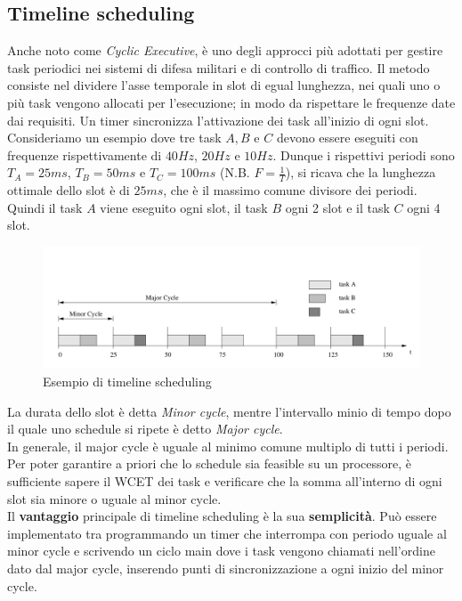 \documentclass[12pt]{article}
\begin{document}
\subsection{Timeline scheduling}
Anche noto come \textit{Cyclic Executive}, è uno degli approcci più adottati per gestire task periodici nei sistemi di difesa militari e di controllo di traffico.
Il metodo consiste nel dividere l'asse temporale in slot di egual lunghezza, nei quali uno o più task vengono allocati per l'esecuzione; in modo da rispettare le frequenze date dai requisiti.
Un timer sincronizza l'attivazione dei task all'inizio di ogni slot.\\
Consideriamo un esempio dove tre task $A,B$ e $C$ devono essere eseguiti con frequenze rispettivamente di $40Hz$, $20Hz$ e $10Hz$.
Dunque i rispettivi periodi sono $T_A=25ms$, $T_B=50ms$ e $T_C=100ms$ (N.B. $F=\frac{1}{T}$), si ricava che la lunghezza ottimale dello slot è di 
$25ms$, che è il massimo comune divisore dei periodi. Quindi il task $A$ viene eseguito ogni slot, il task $B$ ogni 2 slot e il task $C$ ogni 4 slot.
\begin{figure}[H]
    \centering
    \includegraphics[width=\textwidth]{pictures/timelineScheduling.png}
    \caption{Esempio di timeline scheduling}
\end{figure}
\noindent La durata dello slot è detta \textit{Minor cycle}, mentre l'intervallo minio di tempo dopo il quale uno schedule si ripete è detto \textit{Major cycle}.
\\
In generale, il major cycle è uguale al minimo comune multiplo di tutti i periodi. Per poter garantire a priori che lo schedule sia feasible su un processore,
è sufficiente sapere il WCET dei task e verificare che la somma all'interno di ogni slot sia minore o uguale al minor cycle.
\\
Il \textbf{vantaggio} principale di timeline scheduling è la sua \textbf{semplicità}. Può essere implementato tra programmando un timer che interrompa con periodo uguale al minor cycle
e scrivendo un ciclo main dove i task vengono chiamati nell'ordine dato dal major cycle, inserendo punti di sincronizzazione a ogni inizio del minor cycle.
\end{document}
